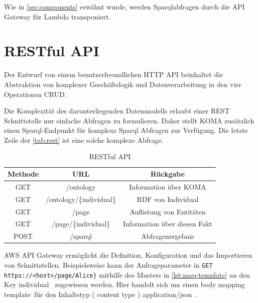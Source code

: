 \documentclass[
12pt,
english,
ngerman,
headsepline,
twoside,
openright,
numbers=noenddot,version=first
]{scrreprt}
\providecommand{\tabularnewline}{\\}
\begin{document}
Wie in \autoref{sec:components} erwähnt wurde, werden Sparqlabfragen durch die \acrshort{API} Gateway für Lambda transponiert.


\section{RESTful API}
\label{sec:rest}
Der Entwurf von einem benutzerfreundlichen \acrfull{HTTP} \acrshort{API} beinhaltet die Abstraktion von komplexer Geschäftslogik und Datenverarbeitung  in den vier Operationen \acrfull{CRUD}.

Die Komplexität des darunterliegenden Datenmodells erlaubt einer \acrshort{REST} Schnittstelle nur einfache Abfragen zu formulieren.\cite{microAdv} Daher stellt \acrshort{KOMA} zusätzlich einen Sparql-Endpunkt für komplexe Sparql Abfragen zur Verfügung. Die letzte Zeile der \autoref{tab:rest} ist eine solche komplexe Abfrage.

\begin{table}[H]
	\caption{RESTful API}\label{tab:rest}
	\noindent 
	\centering{}
	\begin{tabular}{ccc}
		\hline
		\noalign{\vskip\doublerulesep}
		Methode & URL & Rückgabe\tabularnewline[\doublerulesep]
		\hline
		\noalign{\vskip\doublerulesep}
		GET & /ontology & Information über KOMA
		\tabularnewline[\doublerulesep]\noalign{\vskip\doublerulesep}
		\noalign{\vskip\doublerulesep}
		GET & /ontology/\{individual\} & RDF von Individual
		\tabularnewline[\doublerulesep]\noalign{\vskip\doublerulesep}
		GET & /page & Auflistung von Entitäten 
		\tabularnewline[\doublerulesep]\noalign{\vskip\doublerulesep}
		GET & /page/\{individual\} & Information über diesen Fakt
		\tabularnewline[\doublerulesep]\noalign{\vskip\doublerulesep}
		POST & /sparql & Abfragenergebnis
		
	\end{tabular}
\end{table}

AWS API Gateway ermöglicht die Definition, Konfiguration und das Importieren von Schnittstellen. Beispielsweise kann der Anfrageparameter in \lstinline|GET https://<host>/page/Alice}| mithilfe des Musters in  \autoref{lst:map-template} an den Key \glqq individual \grqq\ zugewiesen werden. Hier handelt sich um einen \glqq body mapping template\grqq\ für den Inhaltstyp ( content type ) \glqq application/json\grqq\ .
\end{document}
